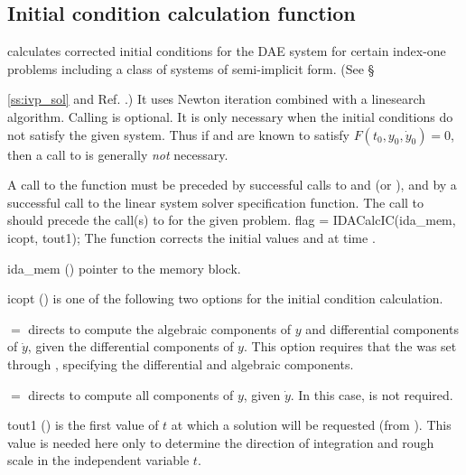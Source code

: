 
\subsection{Initial condition calculation function}\label{ss:idacalcic}

 calculates corrected initial conditions for the DAE system
for certain index-one problems including a class of systems of semi-implicit
form.  (See \S{\ref{ss:ivp_sol} and Ref. \cite{BHP:98}.)
It uses Newton iteration combined with a linesearch algorithm.
Calling  is optional. It is only necessary when the
initial conditions do not satisfy the given system.  Thus if
 and  are known to satisfy $F(t_0, y_0, \dot{y}_0) = 0$,
then a call to  is generally {\em not} necessary.

A call to the function  must be preceded by successful calls to
 and  (or ), and by a
successful call to the linear system solver specification function.
The call to  should precede the call(s) to 
for the given problem.
%
{
  flag = IDACalcIC(ida\_mem, icopt, tout1);
}
{
  The function  corrects the initial values  and  at
  time .
}
{
  \begin{args}

  \item[ida\_mem] ()
    pointer to the {\ida} memory block.

  \item[icopt] ()
    is one of the following two options for the initial condition calculation.

    $ = $ directs  to compute
    the algebraic components of $y$ and differential components of $\dot{y}$,
    given the differential components of $y$.
    This option requires that the   was set through
    , specifying the differential and algebraic components.

    $ = $ directs  to compute all
    components of $y$, given $\dot{y}$.  In this case,  is not required.

  \item[tout1] ()
    is the first value of $t$ at which a solution will be requested (from
    ).  This value is needed here only to determine the direction of
    integration and rough scale in the independent variable $t$.


\end{args}}}
